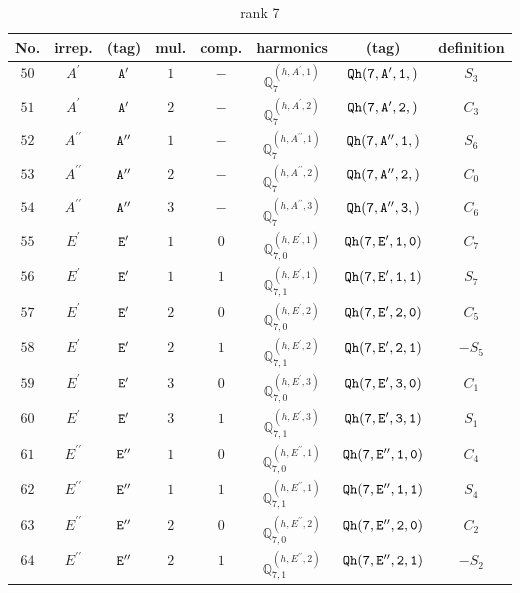 \documentclass[fleqn,8pt]{jsarticle}
\begin{document}
\begin{table}[ht!]
\begin{center}
\caption{rank 7}
\renewcommand{\arraystretch}{1.3}
\begin{tabular}{cccccccc} \hline \hline
No. & irrep. & (tag) & mul. & comp. & harmonics & (tag) & definition \\ \hline
$ 50 $ & $ A^{\prime} $ & $ {\tt A'} $ & $ 1 $ & $ - $ & $ \mathbb{Q}_{7}^{(h,A^{\prime},1)} $ & $ {\tt Qh(7,A',1,)} $ & $ S_{3} $ \\
$ 51 $ & $ A^{\prime} $ & $ {\tt A'} $ & $ 2 $ & $ - $ & $ \mathbb{Q}_{7}^{(h,A^{\prime},2)} $ & $ {\tt Qh(7,A',2,)} $ & $ C_{3} $ \\
$ 52 $ & $ A^{\prime\prime} $ & $ {\tt A''} $ & $ 1 $ & $ - $ & $ \mathbb{Q}_{7}^{(h,A^{\prime\prime},1)} $ & $ {\tt Qh(7,A'',1,)} $ & $ S_{6} $ \\
$ 53 $ & $ A^{\prime\prime} $ & $ {\tt A''} $ & $ 2 $ & $ - $ & $ \mathbb{Q}_{7}^{(h,A^{\prime\prime},2)} $ & $ {\tt Qh(7,A'',2,)} $ & $ C_{0} $ \\
$ 54 $ & $ A^{\prime\prime} $ & $ {\tt A''} $ & $ 3 $ & $ - $ & $ \mathbb{Q}_{7}^{(h,A^{\prime\prime},3)} $ & $ {\tt Qh(7,A'',3,)} $ & $ C_{6} $ \\
$ 55 $ & $ E^{\prime} $ & $ {\tt E'} $ & $ 1 $ & $ 0 $ & $ \mathbb{Q}_{7,0}^{(h,E^{\prime},1)} $ & $ {\tt Qh(7,E',1,0)} $ & $ C_{7} $ \\
$ 56 $ & $ E^{\prime} $ & $ {\tt E'} $ & $ 1 $ & $ 1 $ & $ \mathbb{Q}_{7,1}^{(h,E^{\prime},1)} $ & $ {\tt Qh(7,E',1,1)} $ & $ S_{7} $ \\
$ 57 $ & $ E^{\prime} $ & $ {\tt E'} $ & $ 2 $ & $ 0 $ & $ \mathbb{Q}_{7,0}^{(h,E^{\prime},2)} $ & $ {\tt Qh(7,E',2,0)} $ & $ C_{5} $ \\
$ 58 $ & $ E^{\prime} $ & $ {\tt E'} $ & $ 2 $ & $ 1 $ & $ \mathbb{Q}_{7,1}^{(h,E^{\prime},2)} $ & $ {\tt Qh(7,E',2,1)} $ & $ - S_{5} $ \\
$ 59 $ & $ E^{\prime} $ & $ {\tt E'} $ & $ 3 $ & $ 0 $ & $ \mathbb{Q}_{7,0}^{(h,E^{\prime},3)} $ & $ {\tt Qh(7,E',3,0)} $ & $ C_{1} $ \\
$ 60 $ & $ E^{\prime} $ & $ {\tt E'} $ & $ 3 $ & $ 1 $ & $ \mathbb{Q}_{7,1}^{(h,E^{\prime},3)} $ & $ {\tt Qh(7,E',3,1)} $ & $ S_{1} $ \\
$ 61 $ & $ E^{\prime\prime} $ & $ {\tt E''} $ & $ 1 $ & $ 0 $ & $ \mathbb{Q}_{7,0}^{(h,E^{\prime\prime},1)} $ & $ {\tt Qh(7,E'',1,0)} $ & $ C_{4} $ \\
$ 62 $ & $ E^{\prime\prime} $ & $ {\tt E''} $ & $ 1 $ & $ 1 $ & $ \mathbb{Q}_{7,1}^{(h,E^{\prime\prime},1)} $ & $ {\tt Qh(7,E'',1,1)} $ & $ S_{4} $ \\
$ 63 $ & $ E^{\prime\prime} $ & $ {\tt E''} $ & $ 2 $ & $ 0 $ & $ \mathbb{Q}_{7,0}^{(h,E^{\prime\prime},2)} $ & $ {\tt Qh(7,E'',2,0)} $ & $ C_{2} $ \\
$ 64 $ & $ E^{\prime\prime} $ & $ {\tt E''} $ & $ 2 $ & $ 1 $ & $ \mathbb{Q}_{7,1}^{(h,E^{\prime\prime},2)} $ & $ {\tt Qh(7,E'',2,1)} $ & $ - S_{2} $ \\
 \hline \hline
\end{tabular}
\end{center}
\end{table}
\end{document}
